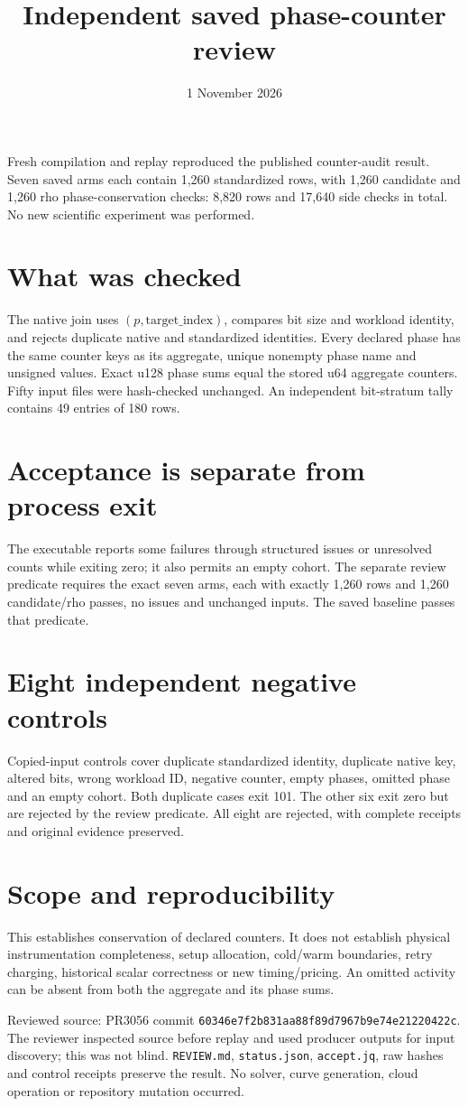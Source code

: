 \documentclass[10pt]{article}\usepackage[margin=0.8in]{geometry}\usepackage[T1]{fontenc}\usepackage{lmodern,hyperref}
\title{Independent saved phase-counter review}\date{1 November 2026}
\begin{document}
\maketitle
Fresh compilation and replay reproduced the published counter-audit result. Seven saved arms each contain 1,260 standardized rows, with 1,260 candidate and 1,260 rho phase-conservation checks: 8,820 rows and 17,640 side checks in total. No new scientific experiment was performed.
\section*{What was checked}
The native join uses $(p,\mathrm{target\_index})$, compares bit size and workload identity, and rejects duplicate native and standardized identities. Every declared phase has the same counter keys as its aggregate, unique nonempty phase name and unsigned values. Exact u128 phase sums equal the stored u64 aggregate counters. Fifty input files were hash-checked unchanged. An independent bit-stratum tally contains 49 entries of 180 rows.
\section*{Acceptance is separate from process exit}
The executable reports some failures through structured issues or unresolved counts while exiting zero; it also permits an empty cohort. The separate review predicate requires the exact seven arms, each with exactly 1,260 rows and 1,260 candidate/rho passes, no issues and unchanged inputs. The saved baseline passes that predicate.
\section*{Eight independent negative controls}
Copied-input controls cover duplicate standardized identity, duplicate native key, altered bits, wrong workload ID, negative counter, empty phases, omitted phase and an empty cohort. Both duplicate cases exit 101. The other six exit zero but are rejected by the review predicate. All eight are rejected, with complete receipts and original evidence preserved.
\section*{Scope and reproducibility}
This establishes conservation of declared counters. It does not establish physical instrumentation completeness, setup allocation, cold/warm boundaries, retry charging, historical scalar correctness or new timing/pricing. An omitted activity can be absent from both the aggregate and its phase sums.

Reviewed source: PR3056 commit \texttt{60346e7f2b831aa88f89d7967b9e74e21220422c}. The reviewer inspected source before replay and used producer outputs for input discovery; this was not blind. \texttt{REVIEW.md}, \texttt{status.json}, \texttt{accept.jq}, raw hashes and control receipts preserve the result. No solver, curve generation, cloud operation or repository mutation occurred.
\end{document}
